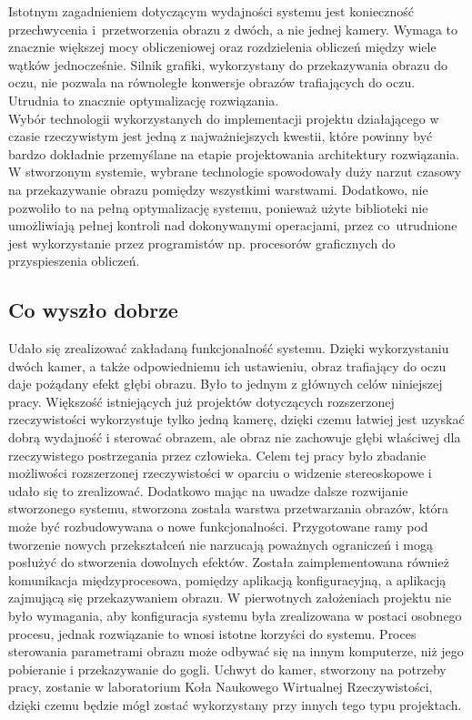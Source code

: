 \documentclass[a4paper,11pt,twoside]{report}
\theoremstyle{definition}
\begin{document}
Istotnym zagadnieniem dotyczącym wydajności systemu jest konieczność przechwycenia i~przetworzenia obrazu z dwóch, a nie jednej kamery. Wymaga to znacznie większej mocy obliczeniowej oraz rozdzielenia obliczeń między wiele wątków jednocześnie. Silnik grafiki, wykorzystany do przekazywania obrazu do oczu, nie pozwala na równoległe konwersje obrazów trafiających do oczu. Utrudnia to znacznie optymalizację rozwiązania. \\
Wybór technologii wykorzystanych do implementacji projektu działającego w czasie rzeczywistym jest jedną z najważniejszych kwestii, które powinny być bardzo dokładnie przemyślane na etapie projektowania architektury rozwiązania. W stworzonym systemie, wybrane technologie spowodowały duży narzut czasowy na przekazywanie obrazu pomiędzy wszystkimi warstwami. Dodatkowo, nie pozwoliło to na pełną optymalizację systemu, ponieważ użyte biblioteki nie umożliwiają pełnej kontroli nad dokonywanymi operacjami, przez co~utrudnione jest wykorzystanie przez programistów np. procesorów graficznych do przyspieszenia obliczeń.

\subsection{Co wyszło dobrze}

Udało się zrealizować zakładaną funkcjonalność systemu. Dzięki wykorzystaniu dwóch kamer, a także odpowiedniemu ich ustawieniu, obraz trafiający do oczu daje pożądany efekt głębi obrazu. Było to jednym z głównych celów niniejszej pracy. Większość istniejących już projektów dotyczących rozszerzonej rzeczywistości wykorzystuje tylko jedną kamerę, dzięki czemu łatwiej jest uzyskać dobrą wydajność i sterować obrazem, ale obraz nie zachowuje głębi właściwej dla rzeczywistego postrzegania przez człowieka. Celem tej pracy było zbadanie możliwości rozszerzonej rzeczywistości w oparciu o widzenie stereoskopowe i udało się to zrealizować. Dodatkowo mając na uwadze dalsze rozwijanie stworzonego systemu, stworzona została warstwa przetwarzania obrazów, która może być rozbudowywana o nowe funkcjonalności. Przygotowane ramy pod tworzenie nowych przekształceń nie narzucają poważnych ograniczeń i mogą posłużyć do stworzenia dowolnych efektów. Została zaimplementowana również komunikacja międzyprocesowa, pomiędzy aplikacją konfiguracyjną, a aplikacją zajmującą się przekazywaniem obrazu. W pierwotnych założeniach projektu nie było wymagania, aby konfiguracja systemu była zrealizowana w postaci osobnego procesu, jednak rozwiązanie to wnosi istotne korzyści do systemu. Proces sterowania parametrami obrazu może odbywać się na innym komputerze, niż jego pobieranie i przekazywanie do gogli.
Uchwyt do kamer, stworzony na potrzeby pracy, zostanie w laboratorium Koła Naukowego Wirtualnej Rzeczywistości, dzięki czemu będzie mógł zostać wykorzystany przy innych tego typu projektach.
\end{document}
